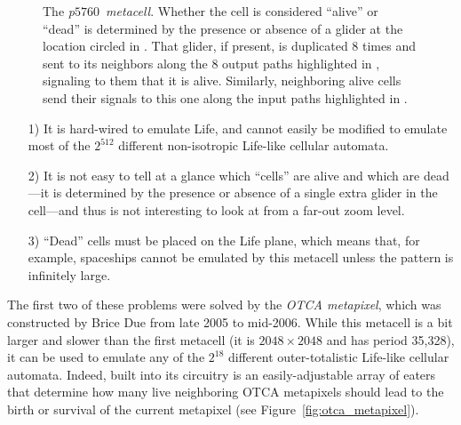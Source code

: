 \begin{figure}[!htb]
	\centering
	\caption{The \emph{p$5760$~metacell}. Whether the cell is considered ``alive'' or ``dead'' is determined by the presence or absence of a glider at the location circled in . That glider, if present, is duplicated $8$ times and sent to its neighbors along the $8$ output paths highlighted in , signaling to them that it is alive. Similarly, neighboring alive cells send their signals to this one along the input paths highlighted in .}\label{fig:p5760_metacell}
\end{figure}

\begin{itemize}
	\item[1)] It is hard-wired to emulate Life, and cannot easily be modified to emulate most of the $2^{512}$ different non-isotropic Life-like cellular automata.\smallskip
	
	\item[2)] It is not easy to tell at a glance which ``cells'' are alive and which are dead---it is determined by the presence or absence of a single extra glider in the cell---and thus is not interesting to look at from a far-out zoom level.\smallskip
	
	\item[3)] ``Dead'' cells must be placed on the Life plane, which means that, for example, spaceships cannot be emulated by this metacell unless the pattern is infinitely large.\smallskip
\end{itemize}

The first two of these problems were solved by the \emph{OTCA metapixel}, which was constructed by Brice Due from late 2005 to mid-2006. While this metacell is a bit larger and slower than the first metacell (it is $2048 \times 2048$ and has period 35,328), it can be used to emulate any of the $2^{18}$ different outer-totalistic Life-like cellular automata. Indeed, built into its circuitry is an easily-adjustable array of eaters that determine how many live neighboring OTCA metapixels should lead to the birth or survival of the current metapixel (see Figure~\ref{fig:otca_metapixel}). 

